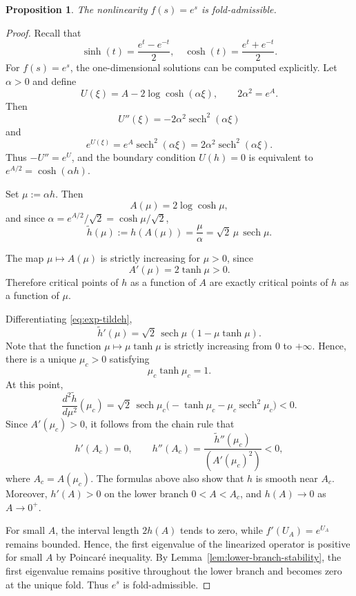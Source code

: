 \documentclass[reqno,12pt]{amsart}
\numberwithin{equation}{section}
\newtheorem{proposition}[theorem]{Proposition}
\theoremstyle{remark}
\begin{document}
\begin{proposition}\label{prop:exp-fold}
The nonlinearity $f(s)=e^s$ is fold-admissible.
\end{proposition}

\begin{proof}
Recall that
$$\sinh(t)=\frac{e^t-e^{-t}}{2},\quad \cosh(t)=\frac{e^t+e^{-t}}{2}. $$
For $f(s)=e^s$, the one-dimensional solutions can be computed explicitly.  Let $\alpha>0$
and define
$$
U(\xi)=A-2\log\cosh(\alpha \xi),
\qquad
2\alpha^2=e^A.
$$
Then
$$
U''(\xi)=-2\alpha^2\operatorname{sech}^2(\alpha \xi)
$$
and
$$
e^{U(\xi)}=e^A\operatorname{sech}^2(\alpha \xi)
=2\alpha^2\operatorname{sech}^2(\alpha \xi).
$$
Thus $-U''=e^U$, and the boundary condition $U(h)=0$ is equivalent to $e^{A/2}=\cosh(\alpha h).$


Set $\mu:=\alpha h.$
Then
$$
A(\mu)=2\log\cosh\mu,
$$
and since $\alpha=e^{A/2}/\sqrt2=\cosh\mu/\sqrt2$,
\begin{equation}\label{eq:exp-tildeh}
    \tilde h(\mu):=h(A(\mu))=\frac{\mu}{\alpha}=\sqrt2\,\mu\,\operatorname{sech}\mu.
\end{equation}

 
The map $\mu\mapsto A(\mu)$ is strictly increasing for $\mu>0$, since
$$
A'(\mu)=2\tanh\mu>0.
$$
Therefore critical points of $h$ as a function of $A$ are exactly critical
points of $h$ as a function of $\mu$.

Differentiating \eqref{eq:exp-tildeh},
$$
\tilde h'(\mu)=\sqrt2\,\operatorname{sech}\mu\,(1-\mu\tanh\mu).
$$
Note that the function $\mu\mapsto \mu\tanh\mu$ is strictly increasing from $0$ to $+\infty$.  Hence, there is a unique $\mu_c>0$ satisfying
$$
\mu_c\tanh\mu_c=1.
$$
At this point,
$$
\frac{d^2\tilde h}{d\mu^2}(\mu_c)
=\sqrt2\,\operatorname{sech}\mu_c
\bigl(-\tanh\mu_c-\mu_c\operatorname{sech}^2\mu_c\bigr)<0.
$$
Since $A'(\mu_c)>0$, it follows from the chain rule that
$$
h'(A_c)=0,
\qquad
h''(A_c)= \frac{\tilde h''(\mu_c)}{(A'(\mu_c)^2)}<0,
$$
where $A_c=A(\mu_c)$.  The  formulas above also show that $h$ is smooth
near $A_c$.  Moreover, $h'(A)>0$ on the lower branch
$0<A<A_c$, and $h(A)\to0$ as $A\to 0^+$.

For small $A$, the interval length $2h(A)$ tends to zero, while
$f'(U_A)=e^{U_A}$ remains bounded.  Hence, the first eigenvalue of the
linearized operator is positive for small $A$ by Poincar\'e inequality.  By
Lemma~\ref{lem:lower-branch-stability}, the first eigenvalue remains positive
throughout the lower branch and becomes zero at the unique fold.  Thus
$e^s$ is fold-admissible.
\end{proof}
\end{document}
